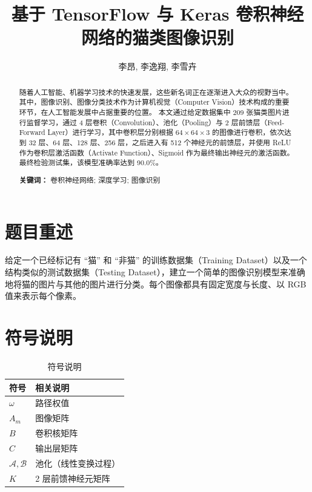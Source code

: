 \documentclass[UTF8]{ctexart}
\author{李昂, 李逸翔, 李雪卉}
\title{基于 TensorFlow 与 Keras 卷积神经网络的猫类图像识别}
\begin{document}
\maketitle
\begin{abstract}
随着人工智能、机器学习技术的快速发展，这些新名词正在逐渐进入大众的视野当中。其中，图像识别、图像分类技术作为计算机视觉（Computer Vision）技术构成的重要环节，在人工智能发展中占据重要的位置。
本文通过给定数据集中 209 张猫类图片进行监督学习，通过 4 层卷积（Convolution）、池化（Pooling）与 2 层前馈层（Feed-Forward Layer）进行学习，其中卷积层分别根据 $64 \times 64 \times 3$ 的图像进行卷积，依次达到 32 层、64 层、128 层、256 层，之后进入有 512 个神经元的前馈层，并使用 ReLU 作为卷积层激活函数（Activate Function）、Sigmoid 作为最终输出神经元的激活函数。最终检验测试集，该模型准确率达到 90.0\%。
\begin{flushleft}
\textbf{关键词：} 卷积神经网络; 深度学习; 图像识别
\end{flushleft}
\end{abstract}

\clearpage

\section{题目重述}
给定一个已经标记有 “猫” 和 “非猫” 的训练数据集（Training Dataset）以及一个结构类似的测试数据集（Testing Dataset），建立一个简单的图像识别模型来准确地将猫的图片与其他的图片进行分类。每个图像都具有固定宽度与长度、以 RGB 值来表示每个像素。

\section{符号说明}
\begin{table}[htbp]
\centering
\caption{符号说明}
\label{signs}
\begin{tabular*}{0.8\textwidth}{p{100pt} | p{200pt}}
\hline
符号               & 相关说明       \\ \hline
$\omega$         & 路径权值       \\
$A_m$            & 图像矩阵       \\
$B$              & 卷积核矩阵      \\
$C$              & 输出层矩阵      \\
$\mathcal{A, B}$ & 池化（线性变换过程） \\
$K$              & 2 层前馈神经元矩阵 \\ \hline
\end{tabular*}
\end{table}
\end{document}
